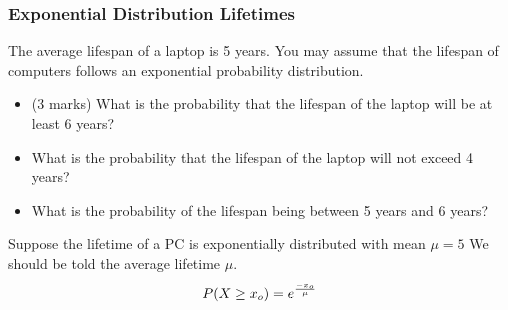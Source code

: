 


\begin{frame}
\frametitle{Exponential Distribution Lifetimes}
The average lifespan of a laptop is 5 years. You may assume that
the lifespan of computers follows an exponential probability
distribution. \begin{itemize}\item (3 marks) What is the
probability that the lifespan of the laptop will be at least 6
years? \item
What is the probability that the lifespan of the laptop will not
exceed 4 years? \item What is the probability of the
lifespan being between 5 years and 6 years?
\end{itemize}
Suppose the lifetime of a PC is exponentially distributed with
mean $\mu =5$
We should be told the average lifetime $\mu$.
\[
P( X \geq x_o) = e^{{-x_o \over \mu}}
\]
\end{frame}











